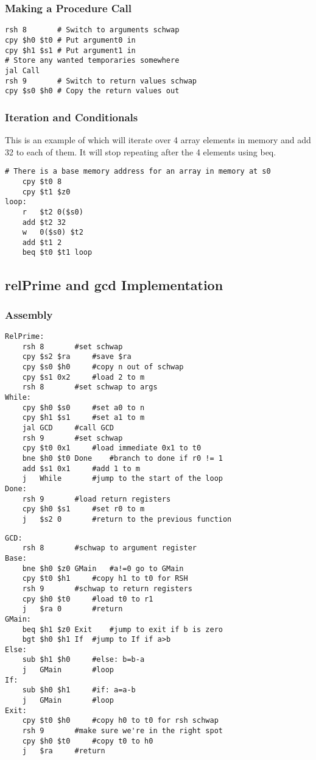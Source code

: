 \documentclass{article}
\begin{document}
		\subsubsection{Making a Procedure Call}
			\begin{lstlisting}[frame=single]
rsh 8		# Switch to arguments schwap
cpy $h0 $t0	# Put argument0 in
cpy $h1 $s1	# Put argument1 in
# Store any wanted temporaries somewhere
jal Call
rsh 9		# Switch to return values schwap
cpy $s0 $h0	# Copy the return values out
			\end{lstlisting}
		\subsubsection{Iteration and Conditionals}
			This is an example of which will iterate over 4 array elements in memory and add 32 to each of them.  It will stop repeating after the 4 elements using beq.
			\begin{lstlisting}[frame=single]
	# There is a base memory address for an array in memory at s0
	cpy $t0 8
	cpy $t1 $z0
loop:
	r   $t2 0($s0)
	add $t2 32
	w   0($s0) $t2
	add $t1 2
	beq $t0 $t1 loop
			\end{lstlisting}
	\subsection{relPrime and gcd Implementation}
		\subsubsection{Assembly}
			\begin{lstlisting}[frame=single]
RelPrime:
	rsh	8		#set schwap
	cpy	$s2 $ra		#save $ra
	cpy	$s0 $h0		#copy n out of schwap
	cpy	$s1 0x2		#load 2 to m
	rsh	8		#set schwap to args
While:
	cpy	$h0 $s0		#set a0 to n
	cpy	$h1 $s1		#set a1 to m
	jal	GCD		#call GCD
	rsh	9		#set schwap
	cpy	$t0 0x1		#load immediate 0x1 to t0
	bne	$h0 $t0 Done	#branch to done if r0 != 1
	add	$s1 0x1		#add 1 to m
	j	While		#jump to the start of the loop
Done:
	rsh	9		#load return registers
	cpy	$h0 $s1		#set r0 to m
	j	$s2 0		#return to the previous function
			\end{lstlisting}
			\begin{lstlisting}[frame=single]
GCD:
	rsh	8		#schwap to argument register
Base:
	bne	$h0 $z0 GMain	#a!=0 go to GMain
	cpy	$t0 $h1		#copy h1 to t0 for RSH
	rsh	9		#schwap to return registers
	cpy	$h0 $t0		#load t0 to r1
	j	$ra 0		#return
GMain:
	beq	$h1 $z0 Exit	#jump to exit if b is zero
	bgt	$h0 $h1 If	#jump to If if a>b
Else:
	sub	$h1 $h0		#else: b=b-a
	j	GMain		#loop
If:
	sub	$h0 $h1		#if: a=a-b
	j	GMain		#loop
Exit:
	cpy	$t0 $h0		#copy h0 to t0 for rsh schwap
	rsh	9		#make sure we're in the right spot
	cpy	$h0 $t0		#copy t0 to h0
	j	$ra		#return
			\end{lstlisting}
\end{document}
